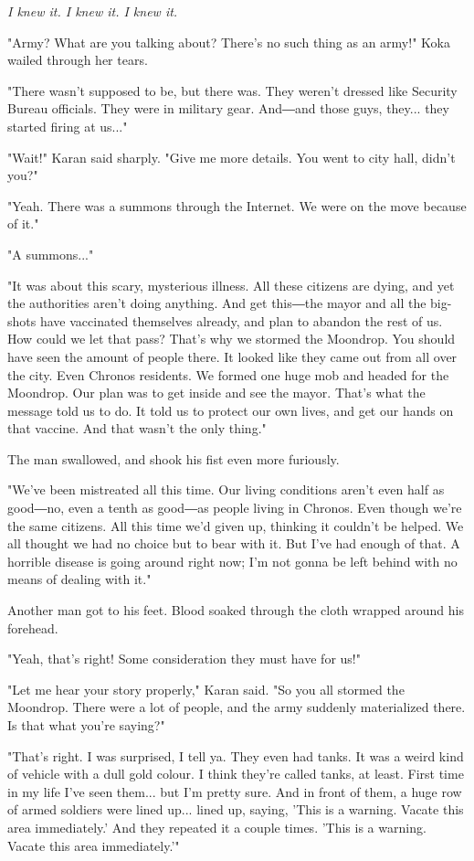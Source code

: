 \emph{I knew it. I knew it. I knew it.}

"Army? What are you talking about? There's no such thing as an army!"
Koka wailed through her tears.

"There wasn't supposed to be, but there was. They weren't dressed like
Security Bureau officials. They were in military gear. And―and those
guys, they... they started firing at us..."

"Wait!" Karan said sharply. "Give me more details. You went to city
hall, didn't you?"

"Yeah. There was a summons through the Internet. We were on the move
because of it."

"A summons..."

"It was about this scary, mysterious illness. All these citizens are
dying, and yet the authorities aren't doing anything. And get this―the
mayor and all the big-shots have vaccinated themselves already, and plan
to abandon the rest of us. How could we let that pass? That's why we
stormed the Moondrop. You should have seen the amount of people there.
It looked like they came out from all over the city. Even Chronos
residents. We formed one huge mob and headed for the Moondrop. Our plan
was to get inside and see the mayor. That's what the message told us to
do. It told us to protect our own lives, and get our hands on that
vaccine. And that wasn't the only thing."

The man swallowed, and shook his fist even more furiously.

"We've been mistreated all this time. Our living conditions aren't even
half as good―no, even a tenth as good―as people living in Chronos. Even
though we're the same citizens. All this time we'd given up, thinking it
couldn't be helped. We all thought we had no choice but to bear with it.
But I've had enough of that. A horrible disease is going around right
now; I'm not gonna be left behind with no means of dealing with it."

Another man got to his feet. Blood soaked through the cloth wrapped
around his forehead.

"Yeah, that's right! Some consideration they must have for us!"

"Let me hear your story properly," Karan said. "So you all stormed the
Moondrop. There were a lot of people, and the army suddenly materialized
there. Is that what you're saying?"

"That's right. I was surprised, I tell ya. They even had tanks. It was a
weird kind of vehicle with a dull gold colour. I think they're called
tanks, at least. First time in my life I've seen them... but I'm pretty
sure. And in front of them, a huge row of armed soldiers were lined
up... lined up, saying, 'This is a warning. Vacate this area
immediately.' And they repeated it a couple times. 'This is a warning.
Vacate this area immediately.'"

